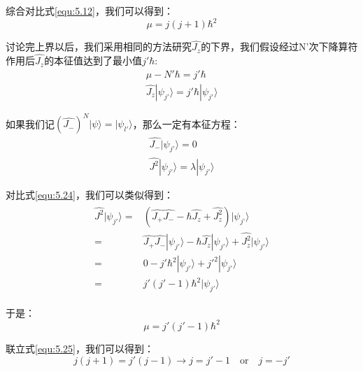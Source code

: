         综合对比式\ref{equ:5.12}，我们可以得到：
        \begin{equation}\label{equ:5.25}
            \mu = j(j+1)\hbar^2
        \end{equation}
        
        讨论完上界以后，我们采用相同的方法研究$\hat{J_z}$的下界，我们假设经过N'次下降算符作用后$\hat{J_z}$的本征值达到了最小值$j'\hbar $:
        \begin{align}\label{equ:5.26}
             \mu - N'\hbar = j'\hbar \\
             \hat{J_z}|\psi _{j'}\rangle= j'\hbar |\psi _{j'}\rangle \label{equ:5.27}
        \end{align}
        
        如果我们记$(\hat{J_-})^N|\psi \rangle=|\psi _{l'}\rangle$，那么一定有本征方程：
        \begin{align} \label{equ:5.28}
             \hat{J_-}|\psi _{j'}\rangle= 0\\
             \hat{J^2}|\psi _{j'}\rangle= \lambda|\psi _{j'}\rangle \label{equ:5.29}
        \end{align}
        
        对比式\ref{equ:5.24}，我们可以类似得到：
        \begin{align}\label{equ:5.30}
            \begin{split}
               \hat{J^2}|\psi_{j'} \rangle=&(\hat{J_+}\hat{J_-}-\hbar \hat{J_z}+\hat{J_z^2})|\psi_{j’} \rangle\\
               =&\hat{J_+}\hat{J_-}|\psi_{j'} \rangle-\hbar \hat{J_z}|\psi_{j'} \rangle+\hat{J_z^2}|\psi_{j'} \rangle\\
               =& 0 -j'\hbar^2 |\psi_{j'} \rangle + {j'}^2 |\psi_{j'} \rangle\\
               =& j'(j'-1)\hbar^2 |\psi_{j'} \rangle
            \end{split}
        \end{align}
        
        于是：\label{equ:5.31}
        \begin{equation}
            \mu = j'(j'-1)\hbar^2
        \end{equation}
        
        联立式\ref{equ:5.25}，我们可以得到：
        \begin{equation}
            j(j+1)=j'(j-1) \longrightarrow j=j'-1 
            \quad \textrm{or} \quad j=-j'
        \end{equation}
        
